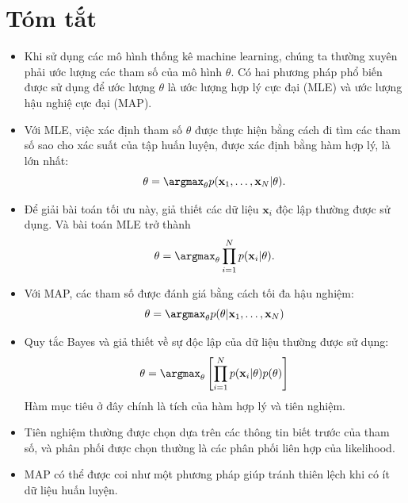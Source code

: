 \section{Tóm tắt}
\begin{itemize}
    \item Khi sử dụng các mô hình thống kê machine learning, chúng ta thường
    xuyên phải ước lượng các tham số của mô hình $\theta$. Có hai phương pháp phổ biến được sử dụng để
    ước lượng $\theta$ là ước lượng hợp lý cực đại (MLE) và ước lượng hậu nghiệ cực đại (MAP).
     
    \item Với MLE, việc xác định tham số $\theta$ được thực hiện bằng cách đi
    tìm các tham số sao cho xác suất của tập huấn luyện, được xác định bằng
    hàm {hợp lý}, là lớn nhất: 
    \begin{equation} 
      \theta = \argmax_{\theta} p(\mathbf{x}_1, \dots, \mathbf{x}_N |\theta). 
    \end{equation} 
     
    \item Để giải bài toán tối ưu này, giả thiết các dữ liệu $\mathbf{x}_i$ độc lập thường được sử dụng. Và bài toán MLE trở thành
    \begin{equation} 
      \theta = \argmax_{\theta} \prod_{i=1}^N p(\mathbf{x}_i | \theta).
    \end{equation} 
     
    \item Với MAP, các tham số được đánh giá bằng cách tối đa {hậu nghiệm}: 
    \begin{equation} 
        \theta = \argmax_{\theta} p(\theta | \mathbf{x}_1, \dots, \mathbf{x}_N) 
    \end{equation} 
    \item Quy tắc Bayes và giả thiết về sự độc lập của dữ
    liệu thường được sử dụng: 
    \begin{equation} \theta = \argmax_{\theta}
        \left[\prod_{i=1}^N p(\mathbf{x}_i | \theta) p(\theta) \right]
    \end{equation} 
    Hàm mục tiêu ở đây chính là tích của {hàm hợp lý} và tiên nghiệm.

     
    \item Tiên nghiệm thường được chọn dựa trên các thông tin biết trước của
    tham số, và phân phối được chọn thường là các phân phối liên hợp của likelihood.
     
    \item MAP có thể được coi như một phương pháp giúp tránh thiên lệch khi có
    ít dữ liệu huấn luyện.
     
\end{itemize}
 
